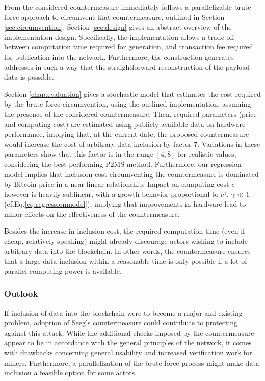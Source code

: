 \documentclass[a4paper,11pt,titlepage]{scrbook}
\begin{document}
From the considered countermeasure immediately follows a parallelizable brute-force approach to circumvent that countermeasure, outlined in Section \ref{sec:circumvention}. Section \ref{sec:design} gives an abstract overview of the implementation design.
Specifically, the implementation allows a trade-off between computation time required for generation, and transaction fee required for publication into the network.
Furthermore, the construction generates addresses in such a way that the straightforward reconstruction of the payload data is possible.

Section \ref{chap:evaluation} gives a stochastic model that estimates the cost required by the brute-force circumvention, using the outlined implementation, assuming the presence of the considered countermeasure.
Then, required parameters (price and computing cost) are estimated using publicly available data on hardware performance, implying that, at the current date, the proposed countermeasure would increase the cost of arbitrary data inclusion by factor 7.
Variations in these parameters show that this factor is in the range $[4, 8]$ for realistic values, considering the best-performing P2MS method.
Furthermore, our regression model implies that inclusion cost circumventing the countermeasure is dominated by Bitcoin price in a near-linear relationship.
Impact on computing cost $c$ however is heavily sublinear, with a growth behavior proportional to $c^\gamma$, $\gamma \ll 1$ (cf.\@ Eq.\@ \ref{eq:regressionmodel}), implying that improvements in hardware lead to minor effects on the effectiveness of the countermeasure.

Besides the increase in inclusion cost, the required computation time (even if cheap, relatively speaking) might already discourage actors wishing to include arbitrary data into the blockchain.
In other words, the countermeasure ensures that a large data inclusion within a reasonable time is only possible if a lot of parallel computing power is available.

\subsubsection*{Outlook}

If inclusion of data into the blockchain were to become a major and existing problem, adoption of Seeg's countermeasure could contribute to protecting against this attack.
While the additional checks imposed by the countermeasure appear to be in accordance with the general principles of the network, it comes with drawbacks concerning general usability and increased verification work for miners.
Furthermore, a parallelization of the brute-force process might make data inclusion a feasible option for some actors.
\end{document}

